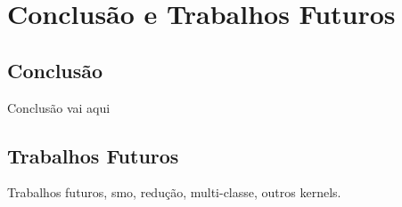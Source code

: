 \chapter{Conclusão e Trabalhos Futuros}\label{chp:LABEL_CHP_6}
\section{Conclusão}\label{sec:LABEL_CHP_6_SEC_A}
Conclusão vai aqui

\section{Trabalhos Futuros}\label{sec:LABEL_CHP_6_SEC_B}
Trabalhos futuros, smo, redução, multi-classe, outros kernels.